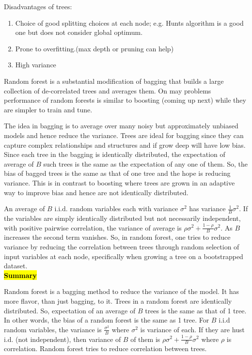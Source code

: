 \noindent Disadvantages of trees:
\begin{enumerate}
\item Choice of good splitting choices at each node; e.g. Hunts algorithm is a good one but does not consider global optimum.
\item Prone to overfitting.(max depth or pruning can help)
\item High variance
\end{enumerate}

Random forest is a substantial modification of bagging
that builds a large collection of de-correlated trees
and averages them. On may problems performance of 
random forests is similar to boosting (coming up next)
while they are simpler to train and tune.

The idea in bagging is to average over many noisy 
but approximately unbiased models and hence reduce the
variance. Trees are ideal for bagging since they can capture
complex relationships and structures and if grow deep will
have low bias.  Since each tree in the bagging is identically
distributed, the expectation of average of $B$ such trees
is the same as the expectation of any one of them. So,
the bias of bagged trees is the same as that of one tree and the hope is
reducing variance. This is in contrast to boosting where
trees are grown in an adaptive way to improve bias and hence are not
identically distributed. 

An average of $B$ i.i.d. random variables each with variance $\sigma^2$
has variance $\frac{1}{B}\sigma^2$. If the variables are simply identically distributed but not necessarily independent, with positive pairwise correlation,
the variance of average is $\rho \sigma^2 + \frac{1-\rho}{B}\sigma^2$.
As $B$ increases the second term vanishes. 
So, in random forest, one tries to reduce variance by reducing
the correlation between trees through random selection of
input variables at each node, specifically when growing a tree
on a bootstrapped dataset.\\

\noindent \hl{\textbf{Summary}}

Random forest is a bagging method to reduce the variance
of the model. It has more flavor, than just bagging, to it.
Trees in a random forest are identically distributed. 
So, expectation of an average of $B$ trees is the same as that of 1 tree.
In other words, the bias of a random forest is the same as 1 tree.
For $B$ i.i.d random variables, the variance is $\frac{\sigma^2}{B}$
where $\sigma^2$ is variance of each. If they are hust i.d. (not independent),
then variance of $B$ of them is $\rho \sigma^2 + \frac{1-\rho}{B} \sigma^2$
where $\rho$ is correlation. Random forest tries to reduce correlation between
trees.

